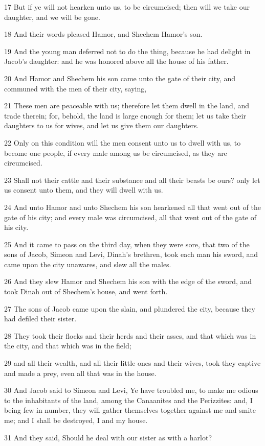\par 17 But if ye will not hearken unto us, to be circumcised; then will we take our daughter, and we will be gone.
\par 18 And their words pleased Hamor, and Shechem Hamor's son.
\par 19 And the young man deferred not to do the thing, because he had delight in Jacob's daughter: and he was honored above all the house of his father.
\par 20 And Hamor and Shechem his son came unto the gate of their city, and communed with the men of their city, saying,
\par 21 These men are peaceable with us; therefore let them dwell in the land, and trade therein; for, behold, the land is large enough for them; let us take their daughters to us for wives, and let us give them our daughters.
\par 22 Only on this condition will the men consent unto us to dwell with us, to become one people, if every male among us be circumcised, as they are circumcised.
\par 23 Shall not their cattle and their substance and all their beasts be ours? only let us consent unto them, and they will dwell with us.
\par 24 And unto Hamor and unto Shechem his son hearkened all that went out of the gate of his city; and every male was circumcised, all that went out of the gate of his city.
\par 25 And it came to pass on the third day, when they were sore, that two of the sons of Jacob, Simeon and Levi, Dinah's brethren, took each man his sword, and came upon the city unawares, and slew all the males.
\par 26 And they slew Hamor and Shechem his son with the edge of the sword, and took Dinah out of Shechem's house, and went forth.
\par 27 The sons of Jacob came upon the slain, and plundered the city, because they had defiled their sister.
\par 28 They took their flocks and their herds and their asses, and that which was in the city, and that which was in the field;
\par 29 and all their wealth, and all their little ones and their wives, took they captive and made a prey, even all that was in the house.
\par 30 And Jacob said to Simeon and Levi, Ye have troubled me, to make me odious to the inhabitants of the land, among the Canaanites and the Perizzites: and, I being few in number, they will gather themselves together against me and smite me; and I shall be destroyed, I and my house.
\par 31 And they said, Should he deal with our sister as with a harlot?

